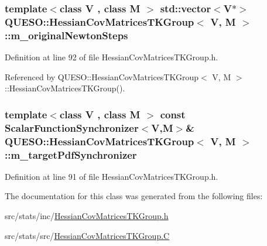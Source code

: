 \hypertarget{class_q_u_e_s_o_1_1_hessian_cov_matrices_t_k_group_a4c0fe3171a35cdd453a4e23e1438ddf9}{
\subsubsection[{m\-\_\-original\-Newton\-Steps}]{\setlength{\rightskip}{0pt plus 5cm}template$<$class V , class M $>$ std\-::vector$<$V$\ast$$>$ {\bf Q\-U\-E\-S\-O\-::\-Hessian\-Cov\-Matrices\-T\-K\-Group}$<$ V, M $>$\-::m\-\_\-original\-Newton\-Steps\hspace{0.3cm}{\ttfamily [private]}}}\label{class_q_u_e_s_o_1_1_hessian_cov_matrices_t_k_group_a4c0fe3171a35cdd453a4e23e1438ddf9}


Definition at line 92 of file Hessian\-Cov\-Matrices\-T\-K\-Group.\-h.



Referenced by Q\-U\-E\-S\-O\-::\-Hessian\-Cov\-Matrices\-T\-K\-Group$<$ V, M $>$\-::\-Hessian\-Cov\-Matrices\-T\-K\-Group().

\hypertarget{class_q_u_e_s_o_1_1_hessian_cov_matrices_t_k_group_a22daa22c22e5d9800c3817f6912ca122}{
\subsubsection[{m\-\_\-target\-Pdf\-Synchronizer}]{\setlength{\rightskip}{0pt plus 5cm}template$<$class V , class M $>$ const {\bf Scalar\-Function\-Synchronizer}$<$V,M$>$\& {\bf Q\-U\-E\-S\-O\-::\-Hessian\-Cov\-Matrices\-T\-K\-Group}$<$ V, M $>$\-::m\-\_\-target\-Pdf\-Synchronizer\hspace{0.3cm}{\ttfamily [private]}}}\label{class_q_u_e_s_o_1_1_hessian_cov_matrices_t_k_group_a22daa22c22e5d9800c3817f6912ca122}


Definition at line 91 of file Hessian\-Cov\-Matrices\-T\-K\-Group.\-h.



The documentation for this class was generated from the following files\-:\begin{DoxyCompactItemize}
\item 
src/stats/inc/\hyperlink{_hessian_cov_matrices_t_k_group_8h}{Hessian\-Cov\-Matrices\-T\-K\-Group.\-h}\item 
src/stats/src/\hyperlink{_hessian_cov_matrices_t_k_group_8_c}{Hessian\-Cov\-Matrices\-T\-K\-Group.\-C}\end{DoxyCompactItemize}
